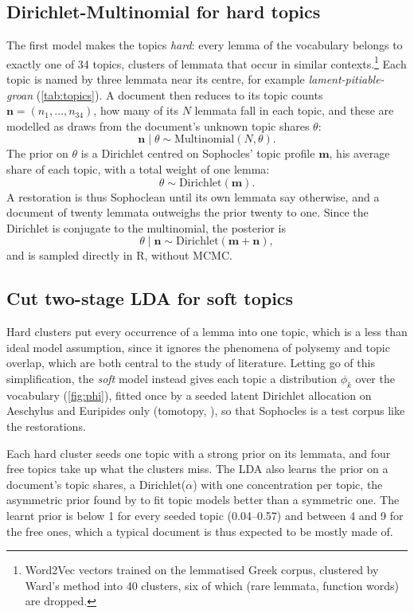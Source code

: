 \documentclass{article}
\theoremstyle{plain}
\theoremstyle{definition}
\theoremstyle{remark}
\begin{document}
\subsection{Dirichlet-Multinomial for hard topics}
\label{sec:hard}

The first model makes the topics \emph{hard}: every lemma of the vocabulary belongs to exactly one of 34 topics, clusters of lemmata that occur in similar contexts.\footnote{Word2Vec vectors \citep{mikolov2013efficient} trained on the lemmatised Greek corpus, clustered by Ward's method into 40 clusters, six of which (rare lemmata, function words) are dropped.} Each topic is named by three lemmata near its centre, for example \textit{lament-pitiable-groan} (\autoref{tab:topics}). A document then reduces to its topic counts $\mathbf n = (n_1, \dots, n_{34})$, how many of its $N$ lemmata fall in each topic, and these are modelled as draws from the document's unknown topic shares $\theta$: \[\mathbf n \mid \theta \sim \mathrm{Multinomial}(N, \theta).\] The prior on $\theta$ is a Dirichlet centred on Sophocles' topic profile $\mathbf m$, his average share of each topic, with a total weight of one lemma: \[\theta \sim \mathrm{Dirichlet}(\mathbf m).\] A restoration is thus Sophoclean until its own lemmata say otherwise, and a document of twenty lemmata outweighs the prior twenty to one. Since the Dirichlet is conjugate to the multinomial, the posterior is \[\theta \mid \mathbf n \sim \mathrm{Dirichlet}(\mathbf m + \mathbf n),\] and is sampled directly in R, without MCMC.

\subsection{Cut two-stage LDA for soft topics}
\label{sec:soft}

Hard clusters put every occurrence of a lemma into one topic, which is a less than ideal model assumption, since it ignores the phenomena of polysemy and topic overlap, which are both central to the study of literature. Letting go of this simplification, the \textit{soft} model instead gives each topic a distribution $\phi_k$ over the vocabulary (\autoref{fig:phi}), fitted once by a seeded latent Dirichlet allocation \citep{blei2003latent} on Aeschylus and Euripides only (tomotopy, \citealt{lee2022tomotopy}), so that Sophocles is a test corpus like the restorations. 

Each hard cluster seeds one topic with a strong prior on its lemmata, and four free topics take up what the clusters miss. The LDA also learns the prior on a document's topic shares, a Dirichlet($\alpha$) with one concentration per topic, the asymmetric prior found by \citet{wallach2009rethinking} to fit topic models better than a symmetric one. The learnt prior is below 1 for every seeded topic (0.04--0.57) and between 4 and 9 for the free ones, which a typical document is thus expected to be mostly made of.
\end{document}
